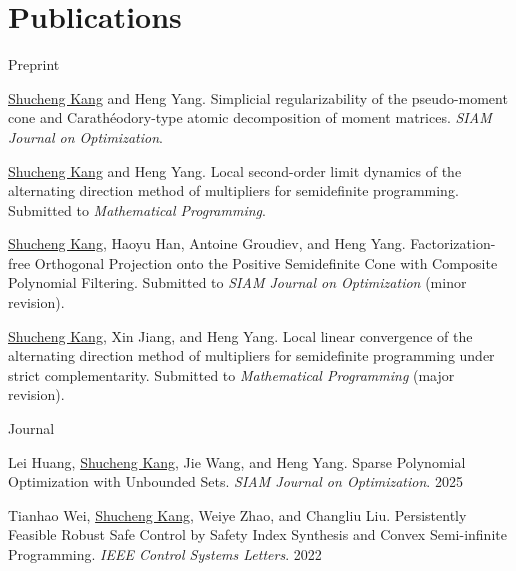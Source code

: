 
\section{\mysidestyle Publications}

Preprint\\
\begin{enumerate}[{label=[P\arabic*]}]
    \item \underline{Shucheng Kang} and Heng Yang.
    Simplicial regularizability of the pseudo-moment cone and Carathéodory-type atomic decomposition of moment matrices. \emph{SIAM Journal on Optimization}.  

    \item \underline{Shucheng Kang} and Heng Yang.
    Local second-order limit dynamics of the alternating direction method of multipliers for semidefinite programming. Submitted to \emph{Mathematical Programming}.  

    \item \underline{Shucheng Kang}, Haoyu Han, Antoine Groudiev, and Heng Yang. Factorization-free Orthogonal Projection onto the Positive Semidefinite Cone with Composite Polynomial Filtering. Submitted to \emph{SIAM Journal on Optimization} (minor revision).  
    
    \item \underline{Shucheng Kang}, Xin Jiang, and Heng Yang. Local linear convergence of the alternating direction method of multipliers for semidefinite programming under strict complementarity. Submitted to \emph{Mathematical Programming} (major revision).  
\end{enumerate}

Journal\\
\begin{enumerate}[{label=[J\arabic*]}]
    \item Lei Huang, \underline{Shucheng Kang}, Jie Wang, and Heng Yang. Sparse Polynomial Optimization with Unbounded Sets. \emph{SIAM Journal on Optimization}. 2025  
    
    \item Tianhao Wei, \underline{Shucheng Kang}, Weiye Zhao, and Changliu Liu. Persistently Feasible Robust Safe Control by Safety Index Synthesis and Convex Semi-infinite Programming. \emph{IEEE Control Systems Letters}. 2022 
\end{enumerate}

